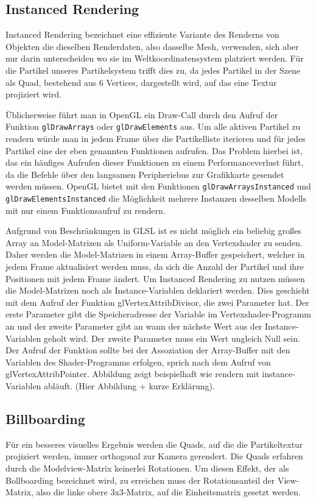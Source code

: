 \subsection{Instanced Rendering}
\label{Kapitel_2_-_Unterkapitel_1.2}
%
Instanced Rendering bezeichnet eine effiziente Variante des Renderns von Objekten die dieselben Renderdaten, also dasselbe Mesh, verwenden, sich aber nur darin unterscheiden wo sie im Weltkoordinatensystem platziert werden. Für die Partikel unseres Partikelsystem trifft dies zu, da jedes Partikel in der Szene als Quad, bestehend aus 6 Vertices, dargestellt wird, auf das eine Textur projiziert wird.

Üblicherweise führt man in OpenGL ein Draw-Call durch den Aufruf der Funktion {\texttt{glDrawArrays}} oder {\texttt{glDrawElements}} aus. Um alle aktiven Partikel zu rendern würde man in jedem Frame über die Partikelliste iterieren und für jedes Partikel eine der eben genannten Funktionen aufrufen. Das Problem hierbei ist, das ein häufiges Aufrufen dieser Funktionen zu einem Performanceverlust führt, da die Befehle über den langsamen Peripheriebus zur Grafikkarte gesendet werden müssen. OpenGL bietet mit den Funktionen {\texttt{glDrawArraysInstanced}} und {\texttt{glDrawElementsInstanced}} die Möglichkeit mehrere Instanzen desselben Modells mit nur einem Funktionsaufruf zu rendern.

Aufgrund von Beschränkungen in GLSL ist es nicht möglich ein beliebig großes Array an Model-Matrizen als Uniform-Variable an den Vertexshader zu senden. Daher werden die Model-Matrizen in einem Array-Buffer gespeichert, welcher in jedem Frame aktualisiert werden muss, da sich die Anzahl der Partikel und ihre Positionen mit jedem Frame ändert. 
Um Instanced Rendering zu nutzen müssen die Model-Matrizen noch als Instance-Variablen deklariert werden. Dies geschieht mit dem Aufruf der Funktion glVertexAttribDivisor, die zwei Parameter hat. Der erste Parameter gibt die Speicheradresse der Variable im Vertexshader-Programm an und der zweite Parameter gibt an wann der nächste Wert aus der Instance-Variablen geholt wird. Der zweite Parameter muss ein Wert ungleich Null sein.  Der Aufruf der Funktion sollte bei der Assoziation der Array-Buffer mit den Variablen des Shader-Programms erfolgen, sprich nach dem Aufruf von glVertexAttribPointer.
Abbildung zeigt beispielhaft wie rendern mit instance-Variablen abläuft.
(Hier Abbildung + kurze Erklärung).

\subsection{Billboarding}
\label{Kapitel_2_-_Unterkapitel_1.3}
%
Für ein besseres visuelles Ergebnis werden die Quads, auf die die Partikeltextur projiziert werden, immer orthogonal zur Kamera gerendert. Die Quads erfahren durch die
Modelview-Matrix keinerlei Rotationen. Um diesen Effekt, der als Bollboarding bezeichnet wird, zu erreichen muss der Rotationsanteil der View-Matrix, also die linke obere 3x3-Matrix, auf die Einheitsmatrix gesetzt werden.

